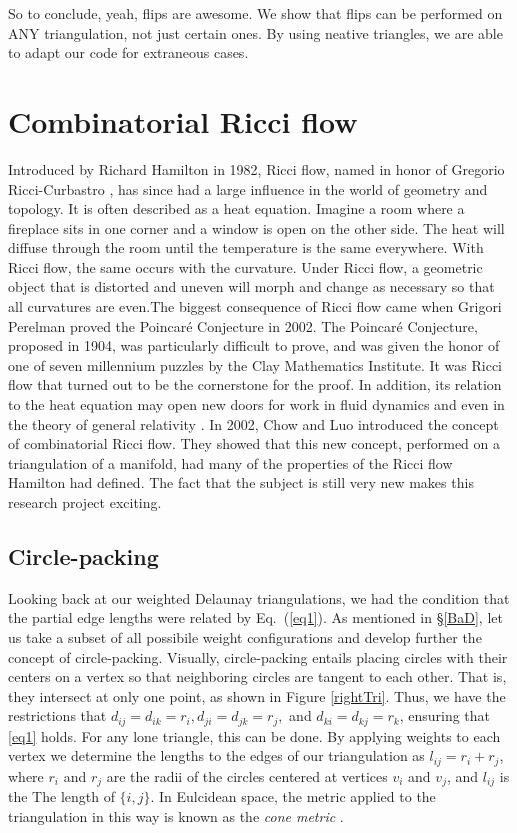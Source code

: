 \documentclass[12pt]{article}
\begin{document}
\noindent So to conclude, yeah, flips are awesome. We show that flips can be performed on ANY triangulation, not just certain ones. By using neative triangles, we are able to adapt our code for extraneous cases. 

\section{Combinatorial Ricci flow}
\label{RBk}

Introduced by Richard Hamilton in 1982, Ricci flow, named in honor of Gregorio Ricci-Curbastro \cite{RicciBkgd}, has since had a large influence in the world of geometry and topology. It is often described as a heat equation. Imagine a room where a fireplace sits in one corner and a window is open on the other side. The heat will diffuse through the room until the temperature is the same everywhere. With Ricci flow, the same occurs with the curvature. Under Ricci flow, a geometric object that is distorted and uneven will morph and change as necessary so that all curvatures are even.The biggest consequence of Ricci flow came when Grigori Perelman proved the Poincar\'{e} Conjecture in 2002. The Poincar\'{e} Conjecture, proposed in 1904, was particularly difficult to prove, and was given the honor of one of seven millennium puzzles by the Clay Mathematics Institute. It was Ricci flow that turned out to be the cornerstone for the proof. In addition, its relation to the heat equation may open new doors for work in fluid dynamics and even in the theory of general relativity \cite{RicciBkgd}. In 2002, Chow and Luo introduced the concept of combinatorial Ricci flow. They showed that this new concept, performed on a triangulation of a manifold, had many of the properties of the Ricci flow Hamilton had defined. The fact that the subject is still very new makes this research project exciting. \newline

\subsection{Circle-packing}

\noindent Looking back at our weighted Delaunay triangulations, we had the condition that the partial edge lengths were related by Eq.~(\ref{eq1}). As mentioned in \S\ref{BaD}, let us take a subset of all possibile weight configurations and develop further the concept of circle-packing. Visually, circle-packing entails placing circles with their centers on a vertex so that neighboring circles are tangent to each other. That is, they intersect at only one point, as shown in Figure \ref{rightTri}. Thus, we have the restrictions that $d_{ij} = d_{ik} = r_i, d_{ji} = d_{jk} = r_j,$ and $d_{ki} = d_{kj} = r_k$, ensuring that \ref{eq1} holds. For any lone triangle, this can be done. By applying weights to each vertex we determine the lengths to the edges of our triangulation as $l_{ij}=r_i+r_j$, where $r_i$ and $r_j$ are the radii of the circles centered at vertices $v_i$ and $v_j$, and $l_{ij}$ is the The length of $\{i, j\}$. In Eulcidean space, the metric applied to the triangulation in this way is known as the \textit{cone metric} \cite{chowluo}.\newline
\end{document}
